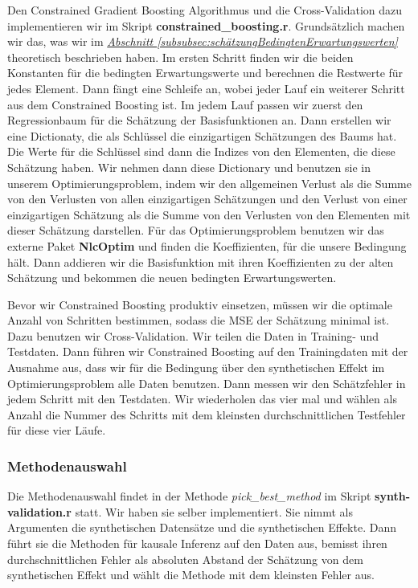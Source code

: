 \documentclass[12pt,a4paper,twoside]{scrartcl}
\numberwithin{equation}{section}
\newcommand{\refsec}[1]{\emph{\hyperref[#1]{Abschnitt \ref*{#1} }}}
\begin{document}
Den Constrained Gradient Boosting Algorithmus und die Cross-Validation dazu implementieren wir im Skript \textbf{constrained\_boosting.r}. Grundsätzlich machen wir das, was wir im \refsec{subsubsec:schätzungBedingtenErwartungswerten} theoretisch beschrieben haben. Im ersten Schritt finden wir die beiden Konstanten für die bedingten Erwartungswerte und berechnen die Restwerte für jedes Element. Dann fängt eine Schleife an, wobei jeder Lauf ein weiterer Schritt aus dem Constrained Boosting ist. Im jedem Lauf passen wir zuerst den Regressionbaum für die Schätzung der Basisfunktionen an. Dann erstellen wir eine Dictionaty, die als Schlüssel die einzigartigen Schätzungen des Baums hat. Die Werte für die Schlüssel sind dann die Indizes von den Elementen, die diese Schätzung haben. Wir nehmen dann diese Dictionary und benutzen sie in unserem Optimierungsproblem, indem wir den allgemeinen Verlust als die Summe von den Verlusten von allen einzigartigen Schätzungen und den Verlust von einer einzigartigen Schätzung als die Summe von den Verlusten von den Elementen mit dieser Schätzung darstellen. Für das Optimierungsproblem benutzen wir das externe Paket \textbf{NlcOptim} und finden die Ko­ef­fi­zi­enten, für die unsere Bedingung hält. Dann addieren wir die Basisfunktion mit ihren Koeffizienten zu der alten Schätzung und bekommen die neuen bedingten Erwartungswerten.\par 

\noindent
Bevor wir Constrained Boosting produktiv einsetzen, müssen wir die optimale Anzahl von Schritten bestimmen, sodass die MSE der Schätzung minimal ist. Dazu benutzen wir Cross-Validation. Wir teilen die Daten in Training- und Testdaten. Dann führen wir Constrained Boosting auf den Trainingdaten mit der Ausnahme aus, dass wir für die Bedingung über den synthetischen Effekt im Optimierungsproblem alle Daten benutzen. Dann messen wir den Schätzfehler in jedem Schritt mit den Testdaten. Wir wiederholen das vier mal und wählen als Anzahl die Nummer des Schritts mit dem kleinsten durchschnittlichen Testfehler für diese vier Läufe.\par  

\subsubsection{Methodenauswahl}\label{subsubsec:methodenauswahl}
Die Methodenauswahl findet in der Methode \emph{pick\_best\_method} im Skript \textbf{synth-validation.r} statt. Wir haben sie selber implementiert. Sie nimmt als Argumenten die synthetischen Datensätze und die synthetischen Effekte. Dann führt sie die Methoden für kausale Inferenz auf den Daten aus, bemisst ihren durchschnittlichen Fehler als absoluten Abstand der Schätzung von dem synthetischen Effekt und wählt die Methode mit dem kleinsten Fehler aus.\par 
\end{document}
